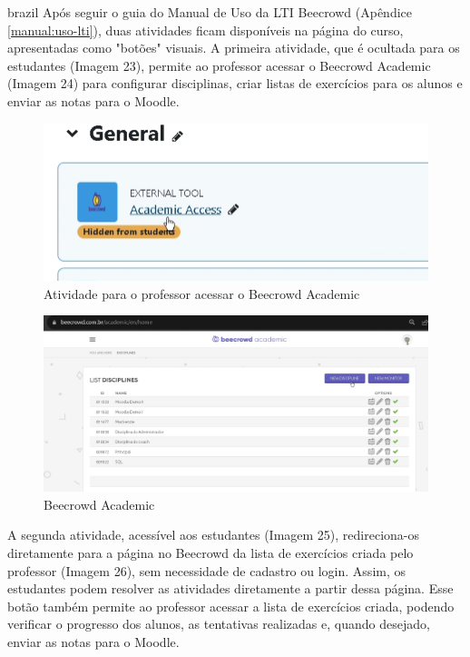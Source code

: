 \begin{otherlanguage*}{brazil}
Após seguir o guia do Manual de Uso da LTI Beecrowd (Apêndice \ref{manual:uso-lti}), duas atividades ficam disponíveis na página do curso, apresentadas como "botões" visuais. A primeira atividade, que é ocultada para os estudantes (Imagem 23), permite ao professor acessar o Beecrowd Academic (Imagem 24) para configurar disciplinas, criar listas de exercícios para os alunos e enviar as notas para o Moodle.

\begin{figure}[H]
    \centering
            \caption{Atividade para o professor acessar o Beecrowd Academic}
            \label{fig:ModeloConceitual}
        \includegraphics[scale=0.35]{pictures/apendices/apendice_b_5.png}
\end{figure}

\begin{figure}[H]
    \centering
            \caption{Beecrowd Academic}
            \label{fig:ModeloConceitual}
        \includegraphics[scale=0.38]{pictures/desenvolvimento/lti_beecrowd_academic.png}
\end{figure}

A segunda atividade, acessível aos estudantes (Imagem 25), redireciona-os diretamente para a página no Beecrowd da lista de exercícios criada pelo professor (Imagem 26), sem necessidade de cadastro ou login. Assim, os estudantes podem resolver as atividades diretamente a partir dessa página. Esse botão também permite ao professor acessar a lista de exercícios criada, podendo verificar o progresso dos alunos, as tentativas realizadas e, quando desejado, enviar as notas para o Moodle.


\end{otherlanguage*}
